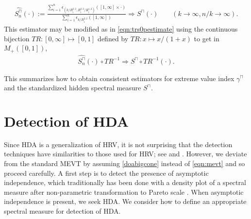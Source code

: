 \documentclass[11 pt]{amsart}
\numberwithin{equation}{section}
\begin{document}
{{\begin{align}\label{eqn:ssqcappestimate}
\widehat{S_n^{\sqcap}}(\cdot) :=
\frac{ \sum_{i=1}^n \epsilon_{\left({k}/{
R^{2, 2}_i} , {R^{2, 2}_i}/{R^{1, 2}_i} \right)} \left([1, \infty]
\times \cdot \right)}{\sum_{i=1}^n \epsilon_{{k}/{R^{2, 2}_i}
}([1, \infty])} \Rightarrow S^{\sqcap}(\cdot) \qquad (k \to \infty, n/k \to \infty).
\end{align}
{This estimator may be modified as in \eqref{eqn:trs0pestimate}}
using the continuous bijection $TR:[0,\infty]\mapsto [0,1]$ defined by
$TR: x\mapsto x/(1+x)$ to get in $M_+([0,1])$,
\begin{align}\label{eqn:trspestimate}
\widehat{S_n^{\sqcap}}(\cdot) \circ TR^{-1}
\Rightarrow S^\sqcap \circ TR^{-1}(\cdot) .
\end{align}

This summarizes how to obtain consistent estimators for extreme value
index $\gamma^{\sqcap}$ and the standardized hidden spectral measure
$S^{\sqcap}$. 

\section{Detection of HDA}\label{sec:detectionestimation}
Since HDA is a generalization of HRV,  it is not surprising that the
detection  techniques have similarities to
{those used for} HRV; see \citet{mitra:resnick:2010a} and 
\citet[pages 316-340]{resnickbook:2007}. However,  we  deviate from the standard
MEVT by assuming \eqref{doabigcone} instead of \eqref{eqn:mevt} and so
proceed carefully.
A first step is to detect the presence of asymptotic independence,
which traditionally has been done with
a density plot of a spectral measure after non-parametric
transformation to Pareto scale \cite[pages
316-321]{resnickbook:2007}.  When asymptotic independence is present, we
seek HDA.  We consider how to define an appropriate spectral measure
for detection of HDA.

}}
\end{document}
